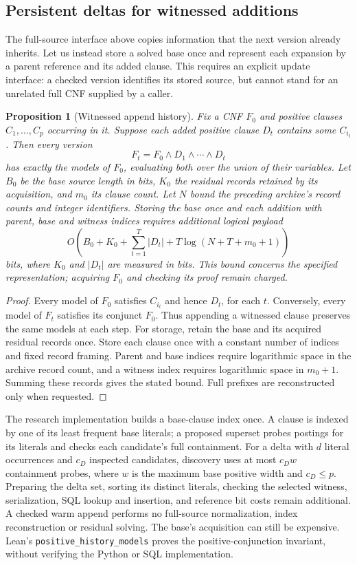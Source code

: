 \documentclass[11pt,a4paper]{article}
\numberwithin{equation}{section}
\theoremstyle{plain}
\newtheorem{proposition}[lemma]{Proposition}
\theoremstyle{definition}
\theoremstyle{remark}
\begin{document}
\subsection{Persistent deltas for witnessed additions}
\label{sec:positive-history}

The full-source interface above copies information that the next version already inherits. Let us instead store a solved base once and represent each expansion by a parent reference and its added clause. This requires an explicit update interface: a checked version identifies its stored source, but cannot stand for an unrelated full CNF supplied by a caller.

\begin{proposition}[Witnessed append history]
\label{prop:positive-history}
Fix a CNF $F_0$ and positive clauses $C_1,\ldots,C_p$ occurring in it. Suppose each added positive clause $D_t$ contains some $C_{i_t}$. Then every version
\[
F_t=F_0\land D_1\land\cdots\land D_t
\]
has exactly the models of $F_0$, evaluating both over the union of their variables. Let $B_0$ be the base source length in bits, $K_0$ the residual records retained by its acquisition, and $m_0$ its clause count. Let $N$ bound the preceding archive's record counts and integer identifiers. Storing the base once and each addition with parent, base and witness indices requires additional logical payload
\[
O\!\left(B_0+K_0+\sum_{t=1}^{T}|D_t|
+T\log(N+T+m_0+1)\right)
\]
bits, where $K_0$ and $|D_t|$ are measured in bits. This bound concerns the specified representation; acquiring $F_0$ and checking its proof remain charged.
\end{proposition}

\begin{proof}
Every model of $F_0$ satisfies $C_{i_t}$ and hence $D_t$, for each $t$. Conversely, every model of $F_t$ satisfies its conjunct $F_0$. Thus appending a witnessed clause preserves the same models at each step. For storage, retain the base and its acquired residual records once. Store each clause once with a constant number of indices and fixed record framing. Parent and base indices require logarithmic space in the archive record count, and a witness index requires logarithmic space in $m_0+1$. Summing these records gives the stated bound. Full prefixes are reconstructed only when requested.
\end{proof}

The research implementation builds a base-clause index once. A clause is indexed by one of its least frequent base literals; a proposed superset probes postings for its literals and checks each candidate's full containment. For a delta with $d$ literal occurrences and $c_D$ inspected candidates, discovery uses at most $c_Dw$ containment probes, where $w$ is the maximum base positive width and $c_D\leq p$. Preparing the delta set, sorting its distinct literals, checking the selected witness, serialization, SQL lookup and insertion, and reference bit costs remain additional. A checked warm append performs no full-source normalization, index reconstruction or residual solving. The base's acquisition can still be expensive. Lean's \texttt{positive\_history\_models} proves the positive-conjunction invariant, without verifying the Python or SQL implementation.
\end{document}
